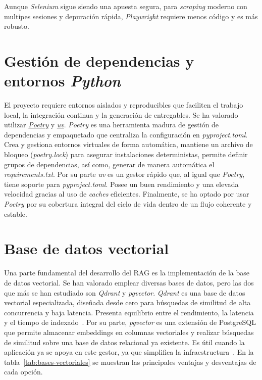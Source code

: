 Aunque \textit{Selenium} sigue siendo una apuesta segura, para \textit{scraping} moderno con multipes sesiones y depuración rápida, \textit{Playwright} requiere menos código y es más robusto. 

\section{Gestión de dependencias y entornos \textit{Python}}
El proyecto requiere entornos aislados y reproducibles que faciliten el trabajo local, la integración continua y la generación de entregables. Se ha valorado utilizar \href{http://python-poetry.org/docs/}{\textit{Poetry}} y \href{https://docs.astral.sh/uv/}{\textit{uv}}. \textit{Poetry} es una herramienta madura de gestión de dependencias y empaquetado que centraliza la configuración en \textit{pyproject.toml}. Crea y gestiona entornos virtuales de forma automática, mantiene un archivo de bloqueo (\textit{poetry.lock}) para asegurar instalaciones deterministas, permite definir grupos de dependencias, así como, generar de manera automática el \textit{requirements.txt}. Por su parte \textit{uv} es un gestor rápido que, al igual que \textit{Poetry}, tiene soporte para \textit{pyproject.toml}. Posee un buen rendimiento y una elevada velocidad gracias al uso de \textit{caches} eficientes. Finalmente, se ha optado por usar \textit{Poetry} por su cobertura integral del ciclo de vida dentro de un flujo coherente y estable.


\section{Base de datos vectorial}
Una parte fundamental del desarrollo del RAG es la implementación de la base de datos vectorial. Se han valorado emplear diversas bases de datos, pero las dos que más se han estudiado son \textit{Qdrant} y \textit{pgvector}. \textit{Qdrant} es una base de datos vectorial especializada, diseñada desde cero para búsquedas de similitud de alta concurrencia y baja latencia. Presenta equilibrio entre el rendimiento, la latencia y el tiempo de indexado~\cite{llmeng:handbook}. Por su parte, \textit{pgvector} es una extensión de PostgreSQL que permite almacenar embeddings en columnas vectoriales y realizar búsquedas de similitud sobre una base de datos relacional ya existente. Es útil cuando la aplicación ya se apoya en este gestor, ya que simplifica la infraestructura~\cite{Qdrant:pgvector}. En la tabla~\ref{tab:bases-vectoriales} se muestran las principales ventajas y desventajas de cada opción.

